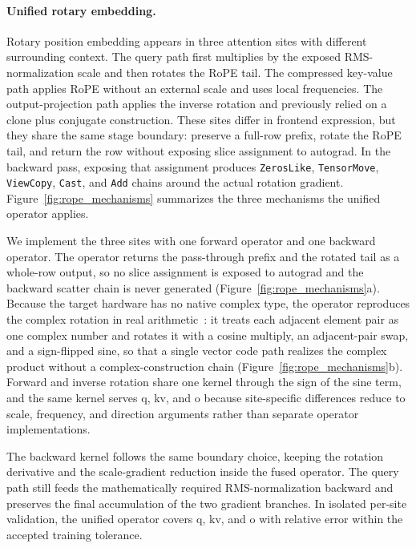 \paragraph{Unified rotary embedding.}
Rotary position embedding appears in three attention sites with different surrounding context. The query path first multiplies by the exposed RMS-normalization scale and then rotates the RoPE tail. The compressed key-value path applies RoPE without an external scale and uses local frequencies. The output-projection path applies the inverse rotation and previously relied on a clone plus conjugate construction. These sites differ in frontend expression, but they share the same stage boundary: preserve a full-row prefix, rotate the RoPE tail, and return the row without exposing slice assignment to autograd. In the backward pass, exposing that assignment produces \texttt{ZerosLike}, \texttt{TensorMove}, \texttt{ViewCopy}, \texttt{Cast}, and \texttt{Add} chains around the actual rotation gradient. Figure~\ref{fig:rope_mechanisms} summarizes the three mechanisms the unified operator applies.

We implement the three sites with one forward operator and one backward operator. The operator returns the pass-through prefix and the rotated tail as a whole-row output, so no slice assignment is exposed to autograd and the backward scatter chain is never generated (Figure~\ref{fig:rope_mechanisms}a). Because the target hardware has no native complex type, the operator reproduces the complex rotation in real arithmetic~\cite{roformer}: it treats each adjacent element pair as one complex number and rotates it with a cosine multiply, an adjacent-pair swap, and a sign-flipped sine, so that a single vector code path realizes the complex product without a complex-construction chain (Figure~\ref{fig:rope_mechanisms}b). Forward and inverse rotation share one kernel through the sign of the sine term, and the same kernel serves q, kv, and o because site-specific differences reduce to scale, frequency, and direction arguments rather than separate operator implementations.

The backward kernel follows the same boundary choice, keeping the rotation derivative and the scale-gradient reduction inside the fused operator. The query path still feeds the mathematically required RMS-normalization backward and preserves the final accumulation of the two gradient branches. In isolated per-site validation, the unified operator covers q, kv, and o with relative error within the accepted training tolerance.

